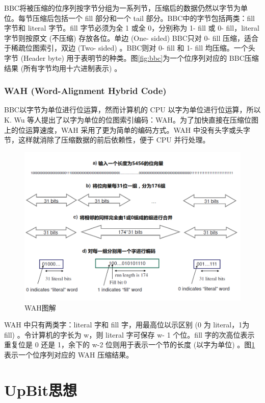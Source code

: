 \documentclass[11pt, a4paper]{article}
\begin{document}
  BBC将被压缩的位序列按字节分组为一系列节，压缩后的数据仍然以字节为单位。每节压缩后包括一个 fill 部分和一个 tail 部分。BBC中的字节包括两类：fill 字节和 literal 字节。fill 字节必须为全 1 或全 0，分别称为 1- fill 或 0- fill，literal 字节则按原文 (不压缩) 存放各位。单边 (One- sided) BBC只对 0- fill 压缩，适合于稀疏位图索引，双边 (Two- sided) 。BBC则对 0- fill 和 1- fill 均压缩。一个头字节 (Header byte) 用于表明节的种类。图\ref{fig:bbc}为一个位序列对应的 BBC压缩结果 (所有字节均用十六进制表示) 。

  \subsubsection{WAH (Word-Alignment Hybrid Code)}

  BBC以字节为单位进行位运算，然而计算机的 CPU 以字为单位进行位运算，所以 K. Wu 等人提出了以字为单位的位图索引编码：WAH。为了加快直接在压缩位图上的位运算速度，WAH 采用了更为简单的编码方式。WAH 中没有头字或头字节，这样就消除了压缩数据的前后依赖性，便于 CPU 并行处理。

  \begin{figure}[H]
    \begin{center}
      \includegraphics[width=5in]{img/wah.png}
      \caption{WAH图解}\label{fig:wah}
    \end{center}
  \end{figure}

  WAH 中只有两类字：literal 字和 fill 字，用最高位以示区别 (0 为 literal，1为 fill) 。令计算机的字长为 w，则 literal 字可保存 w- 1 个位。fill 字的次高位表示重复位是 0 还是 1，余下的 w-2 位则用于表示一个节的长度 (以字为单位) 。图\ref{fig:wah}表示一个位序列对应的 WAH 压缩结果。


  \section{UpBit思想}
\end{document}
